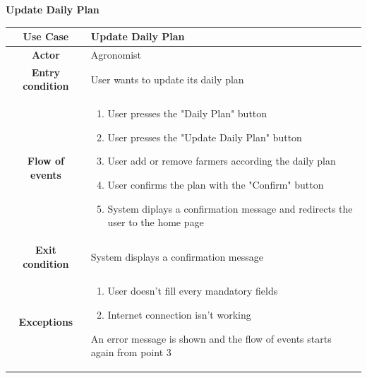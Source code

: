 \documentclass[table, 12pt]{article}
\begin{document}
\begin{itemize}
            \begin{table}[H]
                \item[] \textbf{Update Daily Plan}
                \item[] 
                \centering
                \begin{tabular}{|c| m{}|}
                    \hline
                    \textbf{Use Case} & Update Daily Plan\\ \hline
                    \textbf{Actor} & Agronomist\\ \hline
                    \textbf{Entry condition} & User wants to update its daily plan\\  \hline
                    \textbf{Flow of events} & \begin{enumerate}
                                                \item User presses the "Daily Plan" button
                                                \item User presses the "Update Daily Plan" button
                                                \item User add or remove farmers according the daily plan
                                                \item User confirms the plan with the "Confirm" button
                                                \item System diplays a confirmation message and redirects the user to the home page
                                            \end{enumerate}\\ \hline
                    \textbf{Exit condition} & System displays a confirmation message\\ \hline
                    \textbf{Exceptions} &  \begin{enumerate}
                        \item User doesn't fill every mandatory fields
                        \item Internet connection isn't working
                    \end{enumerate}
                    An error message is shown and the flow of events starts again from point 3\\ \hline                    
                    
                \end{tabular}
            \end{table}


\end{itemize}
\end{document}
